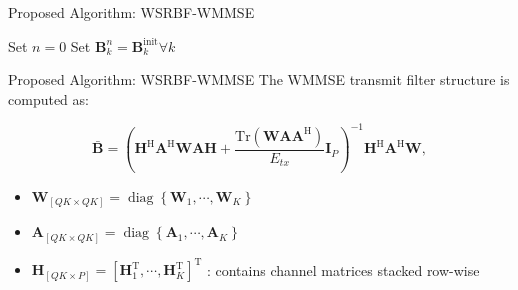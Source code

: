 \documentclass[aspectratio=169, 10pt]{beamer}
\begin{document}
\begin{frame}{Proposed Algorithm: WSRBF-WMMSE}

    \begin{algorithm}[H]
        \DontPrintSemicolon %
        \SetAlgoNoLine      %

        Set $n=0$\;
        Set $\mathbf{B}_k^n = \mathbf{B}_k^{\mathrm{init}} \forall k$\;

        \vspace{0.2cm} %


        \caption{WSRBF-WMMSE Algorithm}
    \end{algorithm}

\end{frame}

\begin{frame}[label=main-update_B]{Proposed Algorithm: WSRBF-WMMSE}
    The WMMSE transmit filter structure is computed as:

    \begin{equation}
        \bar{\mathbf{B}}
        = \left(
        \mathbf{H}^\mathrm{H} \mathbf{A}^\mathrm{H} \mathbf{W} \mathbf{A} \mathbf{H}
        + \frac{\mathrm{Tr}\left(\mathbf{W} \mathbf{A} \mathbf{A}^\mathrm{H}\right)}{E_{tx}}\mathbf{I}_P
        \right)^{-1}\mathbf{H}^\mathrm{H} \mathbf{A}^\mathrm{H} \mathbf{W}
        , \tag{23}
    \end{equation}
    \begin{flushright}
        \hyperlink{app-update_B}{}
    \end{flushright}

    \begin{itemize}
        \item $\mathbf{W}_{\left[QK\times QK\right]} = \operatorname{diag}\left\{\mathbf{W}_1,  \cdots, \mathbf{W}_K\right\}$
        \item $\mathbf{A}_{\left[QK\times QK\right]} = \operatorname{diag}\left\{\mathbf{A}_1,  \cdots, \mathbf{A}_K\right\}$
        \item $\mathbf{H}_{\left[QK\times P\right]} = \left[\mathbf{H}_1^\mathrm{T}, \cdots, \mathbf{H}_K^\mathrm{T}\right]^\mathrm{T}$
              : contains channel matrices stacked row-wise
    \end{itemize}
\end{frame}
\end{document}
